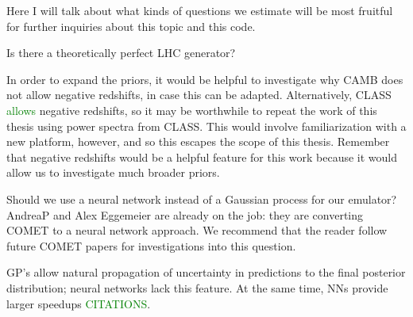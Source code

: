 Here I will talk about what kinds of questions we estimate will be most fruitful for further inquiries about this topic and this code.

Is there a theoretically perfect LHC generator?

In order to expand the priors, it would be helpful to investigate why CAMB does not allow negative redshifts, in case this can be adapted. Alternatively, CLASS \textcolor{green}{allows} negative redshifts, so it may be worthwhile to repeat the work of this thesis using power spectra from CLASS. This would involve familiarization with a new platform, however, and so this escapes the scope of this thesis. Remember that negative redshifts would be a helpful feature for this work because it would allow us to investigate much broader priors.

Should we use a neural network instead of a Gaussian process for our emulator? AndreaP and Alex Eggemeier are already on the job: they are converting COMET to a neural network approach. We recommend that the reader follow future COMET papers for investigations into this question.

GP's allow natural propagation of
uncertainty in predictions to the final posterior distribution; neural
networks lack this feature. At the same time, NNs provide larger speedups \textcolor{green}{CITATIONS}.
